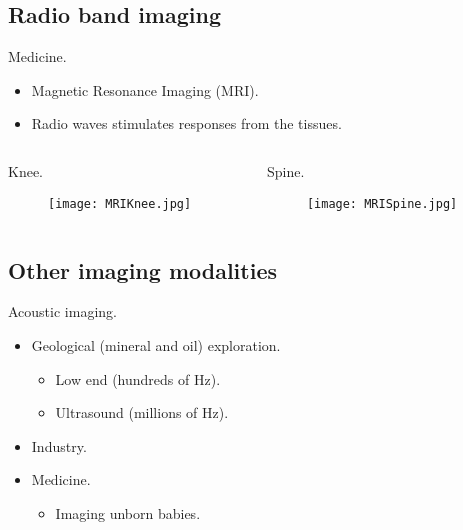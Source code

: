 
\subsection{Radio band imaging}


\begin{frame}
Medicine.
\begin{itemize}
\item Magnetic Resonance Imaging (MRI).
\item Radio waves stimulates responses from the tissues.
\end{itemize}
\begin{columns}
\begin{column}{.48\textwidth}
Knee.
\begin{figure}
\texttt{[image: MRIKnee.jpg]}
\end{figure}
\end{column}
\begin{column}{.48\textwidth}
Spine.
\begin{figure}
\texttt{[image: MRISpine.jpg]}
\end{figure}
\end{column}
\end{columns}
\end{frame}


\subsection{Other imaging modalities}


\begin{frame}
Acoustic imaging.
\begin{itemize}
\item Geological (mineral and oil) exploration.
\begin{itemize}
\item Low end (hundreds of Hz).
\item Ultrasound (millions of Hz).
\end{itemize}
\item Industry.
\item Medicine.
\begin{itemize}
\item Imaging unborn babies.
\end{itemize}
\end{itemize}
\end{frame}


